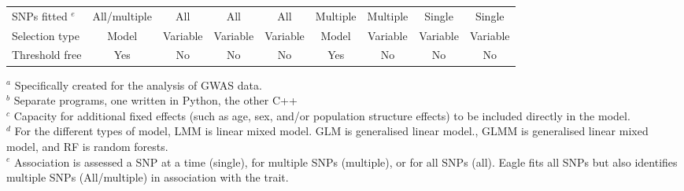 \documentclass{article}
\begin{document}
\begin{landscape}
\begin{table}
\begin{tabular}{lcccccccc}
\hspace{1mm} SNPs fitted $^e$      &    All/multiple      &    All       &   All        &      All          &  Multiple          &  Multiple              &   Single   &  Single   \\  [0.15cm]


\hspace{1mm}  Selection type             & Model   & Variable  &  Variable &  Variable  &  Model  &  Variable & Variable  & Variable \\  [0.15cm]

\hspace{1mm} Threshold free      &    Yes     &  No    &  No         &    No               &     Yes       &  No              &  No   & No      \\  [0.15cm]  \hline
           

\end{tabular}
{$^a$ \scriptsize{Specifically created for the analysis of GWAS data.}}\\
{$^b$ \scriptsize{Separate programs, one written in Python, the other C++}} \\
{$^c$ \scriptsize{Capacity for additional fixed effects (such as  age, sex, and/or population structure effects) to be included directly in the model.}} \\
{$^d$ \scriptsize{For the different types of model, 
LMM is linear mixed model.  GLM is generalised linear model., GLMM is generalised linear mixed model, and RF is random forests.}} \\
{$^e$ \scriptsize{Association is assessed a SNP at a time (single), for multiple SNPs (multiple), or for all SNPs (all). Eagle fits all SNPs but also identifies multiple SNPs (All/multiple) in association with the trait.} } \\
\end{table}


\end{landscape}
\end{document}
